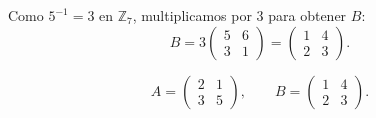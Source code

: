 \documentclass[a4paper,12pt]{article}
\begin{document}
\begin{ejercicio}[title=Ejercicio 5]
Como \(5^{-1}=3\) en \(\mathbb{Z}_7\), multiplicamos por \(3\) para obtener \(B\):
\[
B = 3 \begin{pmatrix}5 & 6\\[2pt] 3 & 1\end{pmatrix}
=
\begin{pmatrix}1 & 4\\[2pt] 2 & 3\end{pmatrix}.
\]

\[
\boxed{A = \begin{pmatrix}2 & 1\\ 3 & 5\end{pmatrix}}, \qquad
\boxed{B = \begin{pmatrix}1 & 4\\ 2 & 3\end{pmatrix}}.
\]

\end{ejercicio}
\end{document}
